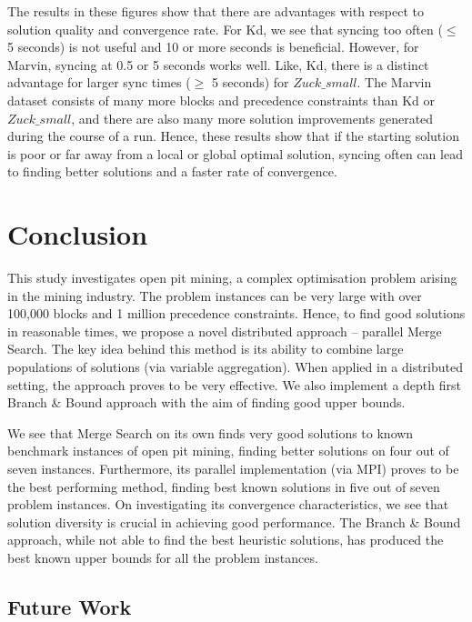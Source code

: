 \documentclass[authoryear,11pt,square,number,times,super,comma]{elsarticle}
\begin{document}
The results in these figures show that there are advantages with respect to solution quality and convergence rate. For Kd, we see that syncing too often ($\leq$ 5 seconds) is not useful and 10 or more seconds is beneficial. However, for Marvin, syncing at 0.5 or 5 seconds works well. Like, Kd, there is a distinct advantage for larger sync times ($\geq$ 5 seconds) for $Zuck\_small$.  The Marvin dataset consists of many more blocks and precedence constraints than Kd or $Zuck\_small$, and there are also many more solution improvements generated during the course of a run. Hence, these results show that if the starting solution is poor or far away from a local or global optimal solution, syncing often can lead to finding better solutions and a faster rate of convergence.

\section{Conclusion}\label{sec:conc}
This study investigates open pit mining, a complex optimisation problem arising in the mining industry. The problem instances can be very large with over 100,000 blocks and 1 million precedence constraints. Hence, to find good solutions in reasonable times, we propose a novel distributed approach -- parallel Merge Search. The key idea behind this method is its ability to combine large populations of solutions (via variable aggregation). When applied in a distributed setting, the approach proves to be very effective. We also implement a depth first Branch \& Bound approach with the aim of finding good upper bounds.

We see that Merge Search on its own finds very good solutions to known benchmark instances of open pit mining, finding better solutions on four out of seven instances. Furthermore, its parallel implementation (via MPI) proves to be the best performing method, finding best known solutions in five out of seven problem instances. On investigating its convergence characteristics, we see that solution diversity is crucial in achieving good performance. The Branch \& Bound approach, while not able to find the best heuristic solutions, has produced the best known upper bounds for all the problem instances. 

\subsection{Future Work}
\end{document}
